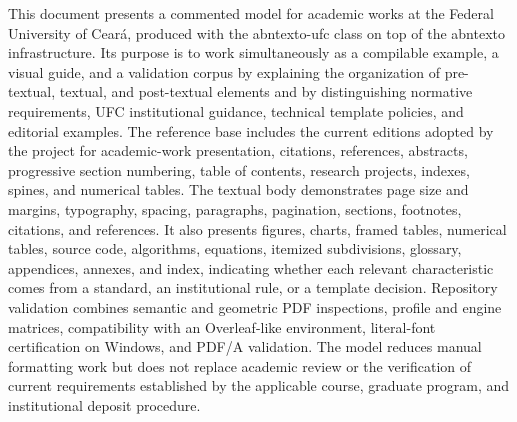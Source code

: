 This document presents a commented model for academic works at the Federal University of Ceará, produced with the abntexto-ufc class on top of the abntexto infrastructure. Its purpose is to work simultaneously as a compilable example, a visual guide, and a validation corpus by explaining the organization of pre-textual, textual, and post-textual elements and by distinguishing normative requirements, UFC institutional guidance, technical template policies, and editorial examples. The reference base includes the current editions adopted by the project for academic-work presentation, citations, references, abstracts, progressive section numbering, table of contents, research projects, indexes, spines, and numerical tables. The textual body demonstrates page size and margins, typography, spacing, paragraphs, pagination, sections, footnotes, citations, and references. It also presents figures, charts, framed tables, numerical tables, source code, algorithms, equations, itemized subdivisions, glossary, appendices, annexes, and index, indicating whether each relevant characteristic comes from a standard, an institutional rule, or a template decision. Repository validation combines semantic and geometric PDF inspections, profile and engine matrices, compatibility with an Overleaf-like environment, literal-font certification on Windows, and PDF/A validation. The model reduces manual formatting work but does not replace academic review or the verification of current requirements established by the applicable course, graduate program, and institutional deposit procedure.

